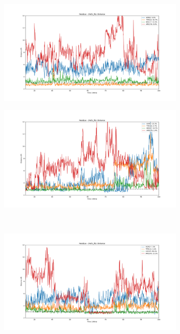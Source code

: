 \documentclass[fleqn,10pt]{wlscirep}
\begin{document}
\begin{figure}[!ht]
\centering
   \begin{subfigure}{.45\textwidth}
     \centering
     \includegraphics[width=.95\linewidth]{2AZU_flip/2AZU_flip-dist_0.png}
   \end{subfigure}
   \begin{subfigure}{.45\textwidth}
     \centering
     \includegraphics[width=.95\linewidth]{2AZU_flip/2AZU_flip-dist_1.png}
   \end{subfigure}
   \\
   \begin{subfigure}{.45\textwidth}
     \centering
     \includegraphics[width=.95\linewidth]{2AZU_flip/2AZU_flip-dist_2.png}

\end{subfigure}
\end{figure}
\end{document}
